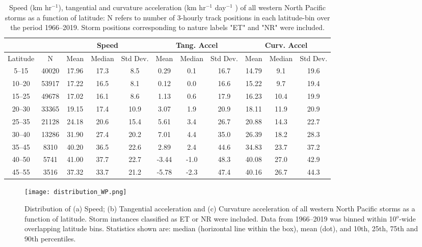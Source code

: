 \documentclass[wcd,manuscript]{copernicus}
\begin{document}
\begin{table*}[t]
\caption{Speed (km hr$^{-1}$), tangential and curvature acceleration  (km hr$^{-1}$ day$^{-1}$ ) of all western North Pacific storms as a function of latitude: N refers to number of 3-hourly track positions in each latitude-bin over the period 1966--2019. Storm positions corresponding to 
nature labels "ET" and "NR" were included.}

\begin{tabular}{cc|ccc|ccc|ccc}
\tophline
& & \multicolumn{3}{|c|}{Speed} & \multicolumn{3}{c|}{Tang. Accel} & \multicolumn{3}{c}{Curv. Accel}\\
\hline
       Latitude &     N &  Mean & Median & Std Dev. & Mean & Median &  Std Dev.& Mean & Median & Std Dev.\\
 	  5--15 & 40020 & 17.96 &  17.3 &   8.5 & 0.29 &   0.1 &  16.7 & 14.79 &   9.1 &  19.6 \\
	 10--20 & 53917 & 17.22 &  16.5 &   8.1 &  0.12 &   0.0 &  16.6 & 15.22 &   9.7 &  19.4 \\
	 15--25 & 49678 & 17.02 &  16.1 &   8.6 &  1.13 &   0.6 &  17.9 & 16.23 &  10.4 &  19.9 \\
	 20--30 & 33365 & 19.15 &  17.4 &  10.9 &  3.07 &   1.9 &  20.9 & 18.11 &  11.9 &  20.9 \\
	 25--35 & 21128 & 24.18 &  20.6 &  15.4 &  5.61 &   3.4 &  26.7 & 20.88 &  14.3 &  22.7 \\
	 30--40 & 13286 & 31.90 &  27.4 &  20.2 &  7.01 &   4.4 &  35.0 & 26.39 &  18.2 &  28.3 \\
	 35--45 &  8310 & 40.20 &  36.5 &  22.6 &  2.89 &   2.4 &  44.6 & 34.83 &  23.7 &  37.2 \\
	 40--50 &  5741 & 41.00 &  37.7 &  22.7 & -3.44 &  -1.0 &  48.3 & 40.08 &  27.0 &  42.9 \\
	 45--55 &  3516 & 37.32 &  33.7 &  21.2 & -5.78 &  -2.3 &  47.4 & 40.16 &  26.7 &  44.3 \\
\hline
\end{tabular}
\label{tab:distWP}
\end{table*}


\clearpage

\begin{figure*}[t]
  \centering
    \texttt{[image: distribution\_WP.png]}
    \caption{Distribution of (a) Speed; (b) Tangential acceleration and (c) Curvature acceleration of all
     western North Pacific storms as a function of latitude. Storm instances classified as ET or NR were included. Data from 1966--2019 was binned within 10$^o$-wide overlapping
     latitude bins. Statistics shown are: median (horizontal line within the box), mean (dot), and 10th,
     25th, 75th and 90th percentiles.}
  \label{fig:distWP}
\end{figure*}
\end{document}
